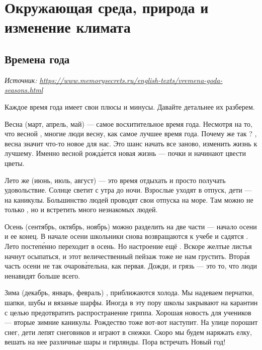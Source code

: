 \chapter{Окружающая среда, природа и изменение климата}

\section{Времена года}
\textit{Источник: \url{https://www.memorysecrets.ru/english-texts/vremena-goda-seasons.html}}

Каждое время года имеет свои плюсы и минусы. Давайте детальнее их разберем.

Весна (март, апрель, май) --- самое восхитительное время года. Несмотря на то, что весной  , многие люди  весну, как самое лучшее время года. Почему же так ? , весна значит что-то новое для нас. Это шанс начать все заново, изменить жизнь к лучшему. Именно весной рожд\'{а}ется новая жизнь ---  почки и начинают цвести цветы.

Лето же (июнь, июль, август) --- это время отдыхать и просто получать удовольствие. Солнце светит с утра до ночи. Взрослые уходят в отпуск, дети --- на каникулы. Большинство людей проводят свои отпуска на море. Там можно не только , но и встретить много незнакомых людей.

Осень (сентябрь, октябрь, ноябрь) можно разделить на две части --- начало осени и ее конец. В начале осени школьники снова возвращаются к учебе и садятся . Лето постеп\'{е}нно переходит в осень. Но настроение ещё . Вскоре желтые листья начнут осыпаться, и этот величественный пейзаж тоже не  нам грустить. Втор\'{а}я часть осени не так очаров\'{а}тельна, как первая. Дожди,  и грязь --- это то, что люди ненавидят больше всего.

Зима (декабрь, январь, февраль) , приближаются холода. Мы надеваем перчатки, шапки, шубы и вязаные шарфы. Иногда в эту пору школы закрывают на карантин с целью предотвратить распространение гриппа. Хорошая новость для учеников --- вторые зимние каникулы. Рождество тоже вот-вот наступит. На улице порошит снег, дети лепят снеговиков и играют в снежки. Скоро мы будем наряжать елку, вешать на нее различные шары и гирлянды. Пора встречать Новый год!

